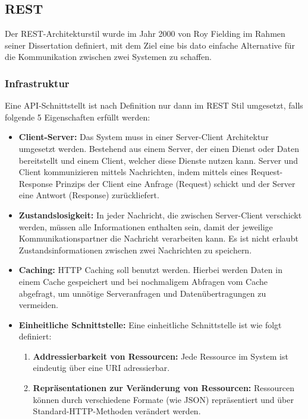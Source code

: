 \subsection{REST}
Der REST-Architekturstil wurde im Jahr 2000 von Roy Fielding im Rahmen seiner Dissertation definiert, mit dem Ziel eine bis dato einfache Alternative für die Kommunikation zwischen zwei Systemen zu schaffen.

\subsubsection*{Infrastruktur}
Eine API-Schnittstellt ist nach Definition nur dann im REST Stil umgesetzt, falls folgende 5 Eigenschaften erfüllt werden:


\begin{itemize}
	\item \textbf{Client-Server:}
Das System muss in einer Server-Client Architektur umgesetzt werden. Bestehend aus einem Server, der einen Dienst oder Daten bereitstellt und einem Client, welcher diese Dienste nutzen kann. Server und Client kommunizieren mittels Nachrichten, indem mittels eines Request-Response Prinzips der Client eine Anfrage (Request) schickt und der Server eine Antwort (Response) zurückliefert.
	
	\item \textbf{Zustandslosigkeit:} 
In jeder Nachricht, die zwischen Server-Client verschickt werden, müssen alle Informationen enthalten sein, damit der jeweilige Kommunikationspartner die Nachricht verarbeiten kann. Es ist nicht erlaubt Zustandsinformationen zwischen zwei Nachrichten zu speichern.
	\item \textbf{Caching:}
HTTP Caching soll benutzt werden. Hierbei werden Daten in einem Cache gespeichert und bei nochmaligem Abfragen vom Cache abgefragt, um unnötige Serveranfragen und Datenübertragungen zu vermeiden.
	\item \textbf{Einheitliche Schnittstelle:}
	Eine einheitliche Schnittstelle ist wie folgt definiert:
	
	\begin{enumerate}
		\item \textbf{Addressierbarkeit von Ressourcen:}
		Jede Ressource im System ist eindeutig über eine URI adressierbar.
		\item \textbf{Repräsentationen zur Veränderung von Ressourcen:}
		Ressourcen können durch verschiedene Formate (wie JSON) repräsentiert und über Standard-HTTP-Methoden verändert werden.
		

\end{enumerate}
\end{itemize}
